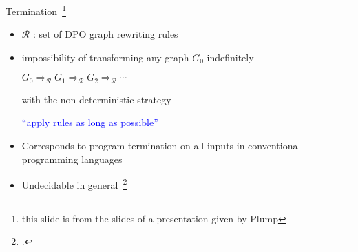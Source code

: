 \documentclass{beamer}
\begin{document}
\begin{frame}{Termination~\footnote{this slide is from the slides of a presentation given by Plump}}
  \begin{itemize}
    \item $\mathcal{R}$ : set of DPO graph rewriting rules
    \item impossibility of transforming any graph $G_0$ indefinitely
      \begin{center}
        $G_0 \Rightarrow_\mathcal{R} G_1 \Rightarrow_\mathcal{R} G_2 \Rightarrow_\mathcal{R} \cdots$
      \end{center}
      with the non-deterministic strategy
          \begin{center}
              \textcolor{blue}{\enquote{apply rules as long as possible}}
          \end{center}
    \item Corresponds to program termination on all inputs in conventional programming languages
          
    \item Undecidable in general~\footcite{plump1998terminationundecidable}

  \end{itemize}
\end{frame}

\end{document}
